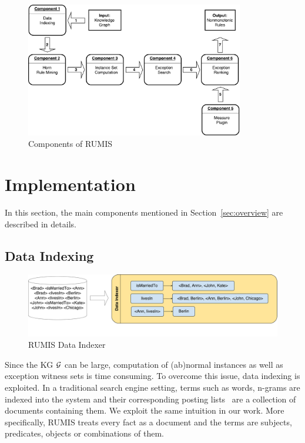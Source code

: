 \begin{figure}[ht]
\centering
\includegraphics[width=0.85\textwidth]{figures/system_overview}
\caption{Components of RUMIS}
\label{system_overview}
\end{figure}

\section{Implementation}

In this section, the main components mentioned in Section~\ref{sec:overview} are described in details.

\subsection{Data Indexing}
\label{data_indexing}

\begin{figure}[ht]
\centering
\includegraphics[width=1.0\textwidth]{figures/data_indexing}
\caption{RUMIS Data Indexer}
\label{data_indexing}
\end{figure}

Since the KG $\mathcal{G}$ can be large, computation of (ab)normal instances as well as exception witness sets is time consuming. To overcome this issue, data indexing is exploited. In a traditional search engine setting, terms such as words, n-grams are indexed into the system and their corresponding posting lists~\cite{ref47} are a collection of documents containing them. We exploit the same intuition in our work. More specifically, RUMIS treats every fact as a document and the terms are subjects, predicates, objects or combinations of them.


